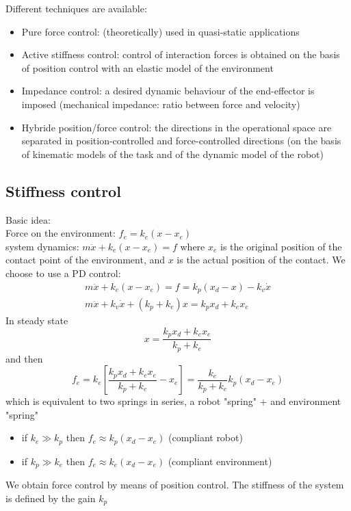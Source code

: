 \documentclass{book}
\begin{document}
Different techniques are available: 
\begin{itemize}
    \item Pure force control: (theoretically) used in quasi-static applications 
    \item Active stiffness control: control of interaction forces is obtained on the basis of position control with an elastic model of the environment 
    \item Impedance control: a desired dynamic behaviour of the end-effector is imposed (mechanical impedance: ratio between force and velocity)
    \item Hybride position/force control: the directions in the operational space are separated in position-controlled and force-controlled directions (on the basis of kinematic models of the task and of the dynamic model of the robot)
\end{itemize}

\subsection{Stiffness control}
Basic idea: \\
Force on the environment: $f_e = k_e(x-x_e)$\\
system dynamics: $m\ddot{x}+k_e(x-x_e)=f$
where $x_e$ is the original position of the contact point of the environment, and $x$ is the actual position of the contact. We choose to use a PD control:
\begin{gather*}
    m\ddot{x}+k_e(x-x_e)=f=k_p(x_d-x)-k_v\dot{x}\\
    m\ddot{x}+k_v\dot{x}+(k_p+k_e)x=k_px_d+k_ex_e
\end{gather*}
In steady state 
\[
    x=\displaystyle\frac{k_px_d+k_ex_e}{k_p+k_e}
\]
and then
\[
    f_e = k_e\left[\displaystyle\frac{k_px_d+k_ex_e}{k_p+k_e}-x_e\right] = \displaystyle\frac{k_e}{k_p+k_e}k_p(x_d-x_e)
\]
which is equivalent to two springs in series, a robot "spring" + and environment "spring"
\begin{itemize}
    \item if $k_e \gg k_p$ then $f_e\approx k_p(x_d-x_e)$ (compliant robot)
    \item if $k_p \gg k_e$ then $f_e\approx k_e(x_d-x_e)$ (compliant environment)
\end{itemize}
We obtain force control by means of position control. The stiffness of the system is defined by the gain $k_p$
\end{document}
